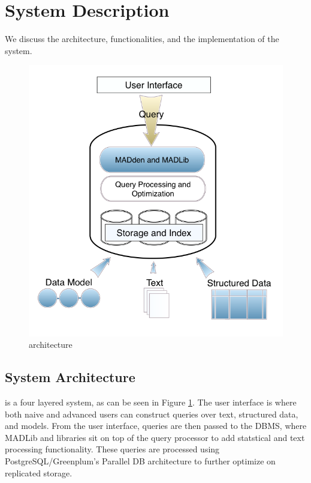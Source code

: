 
\section{System Description}

We discuss the architecture, functionalities, and the implementation of
the {\system} system.
\begin{figure}
   \begin{center}
        \includegraphics[scale=0.2]{content/graphics/arch.png}
        \caption{{\system} architecture}
        \label{fig:arch}
   \end{center}
\end{figure}
    
\subsection{System Architecture}

{\system} is a four layered system, as can be seen in Figure \ref{fig:arch}.
The user interface is where both naive and advanced users can construct queries over
text, structured data, and models. From the user interface, queries are then passed to the
DBMS, where MADLib and {\system} libraries sit on top of the query processor to
add statstical and text processing functionality. These queries are 
processed using PostgreSQL/Greenplum's Parallel DB architecture to further
optimize on replicated storage. 


